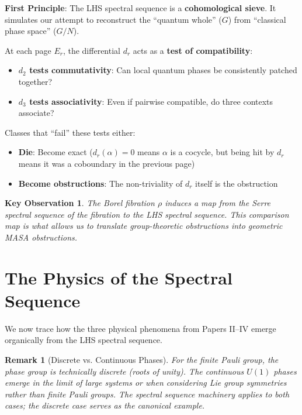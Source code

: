 \documentclass[11pt]{article}
\newtheorem{remark}[theorem]{Remark}
\newtheorem{keyobservation}[theorem]{Key Observation}
\begin{document}
\textbf{First Principle}: The LHS spectral sequence is a \textbf{cohomological sieve}. It simulates our attempt to reconstruct the ``quantum whole'' ($G$) from ``classical phase space'' ($G/N$).

At each page $E_r$, the differential $d_r$ acts as a \textbf{test of compatibility}:
\begin{itemize}
\item \textbf{$d_2$ tests commutativity}: Can local quantum phases be consistently patched together?
\item \textbf{$d_3$ tests associativity}: Even if pairwise compatible, do three contexts associate?
\end{itemize}

Classes that ``fail'' these tests either:
\begin{itemize}
\item \textbf{Die}: Become exact ($d_r(\alpha) = 0$ means $\alpha$ is a cocycle, but being hit by $d_r$ means it was a coboundary in the previous page)
\item \textbf{Become obstructions}: The non-triviality of $d_r$ itself is the obstruction
\end{itemize}

\begin{keyobservation}\label{obs:comparison}
The Borel fibration $\rho$ induces a map from the Serre spectral sequence of the fibration to the LHS spectral sequence. This comparison map is what allows us to translate group-theoretic obstructions into geometric MASA obstructions.
\end{keyobservation}


\section{The Physics of the Spectral Sequence}
\label{physics}

We now trace how the three physical phenomena from Papers II--IV emerge organically from the LHS spectral sequence.

\begin{remark}[Discrete vs. Continuous Phases]
For the finite Pauli group, the phase group is technically discrete (roots of unity). The continuous $U(1)$ phases emerge in the limit of large systems or when considering Lie group symmetries rather than finite Pauli groups. The spectral sequence machinery applies to both cases; the discrete case serves as the canonical example.
\end{remark}
\end{document}

